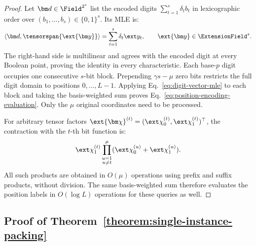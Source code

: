 \begin{proof}
Let \(\bm d\in\Field^{2^s}\) list the encoded digits
\(\sum_{t=1}^s\delta_tb_t\) in lexicographic order over
\((b_1,\ldots,b_s)\in\{0,1\}^s\).
Its MLE is:
\begin{equation}
    \left\langle\bm d,\tensorspan{\ext{\bm y}}\right\rangle
       =\sum_{t=1}^{s}\delta_t\ext y_t,
       \qquad \ext{\bm y}\in\ExtensionField^s.
\label{eq:digit-vector-mle}
\end{equation}
The right-hand side is multilinear and agrees with the encoded
digit at every Boolean point, proving the identity in every
characteristic.
Each base-\(\underline p\) digit occupies one consecutive
\(s\)-bit block. Prepending \(\gamma s-\mu\) zero bits restricts
the full digit domain to positions \(0,\ldots,L-1\).
Applying Eq.~\eqref{eq:digit-vector-mle} to each block and taking
the basis-weighted sum proves
Eq.~\eqref{eq:position-encoding-evaluation}.
Only the \(\mu\) original coordinates need to be processed.

For arbitrary tensor factors
\(\ext{\bm\chi}^{(t)}=(\ext\chi^{(t)}_0,\ext\chi^{(t)}_1)^\top\),
the contraction with the \(t\)-th bit function is:
\[
    \ext\chi^{(t)}_1
       \prod_{\substack{u=1\\u\ne t}}^\mu
          (\ext\chi^{(u)}_0+\ext\chi^{(u)}_1).
\]
All such products are obtained in \(O(\mu)\) operations using
prefix and suffix products, without division.
The same basis-weighted sum therefore evaluates the position
labels in \(O(\log L)\) operations for these queries as well.
\end{proof}

\subsection{Proof of Theorem~\ref{theorem:single-instance-packing}}
\label{appx:proof-single-instance}


